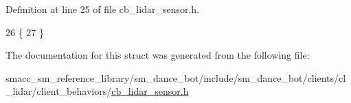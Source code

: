 Definition at line 25 of file cb\+\_\+lidar\+\_\+sensor.\+h.


\begin{DoxyCode}
26   \{
27   \}
\end{DoxyCode}


The documentation for this struct was generated from the following file\+:\begin{DoxyCompactItemize}
\item 
smacc\+\_\+sm\+\_\+reference\+\_\+library/sm\+\_\+dance\+\_\+bot/include/sm\+\_\+dance\+\_\+bot/clients/cl\+\_\+lidar/client\+\_\+behaviors/\hyperlink{include_2sm__dance__bot_2clients_2cl__lidar_2client__behaviors_2cb__lidar__sensor_8h}{cb\+\_\+lidar\+\_\+sensor.\+h}\end{DoxyCompactItemize}
